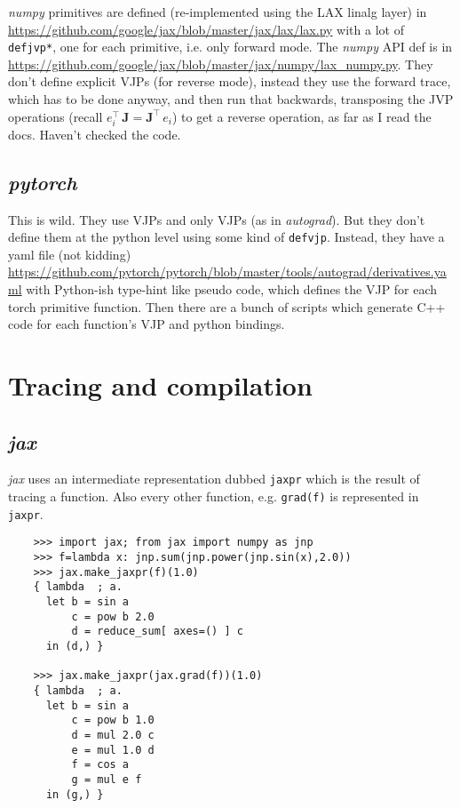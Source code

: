 \documentclass[paper=a4,11pt,headsepline]{scrartcl}
\newcommand{\ve}[1]{\ensuremath{\bm{\mathit{#1}}}}
\newcommand{\ma}[1]{\ensuremath{\bm{\mathbf{#1}}}}
\newcommand{\soft}[1]{\textsl{#1}\xspace}
\newcommand{\numpy}{\soft{numpy}}
\newcommand{\pytorch}{\soft{pytorch}}
\newcommand{\jax}{\soft{jax}}
\newcommand{\autograd}{\soft{autograd}}
\newcommand{\co}[1]{\texttt{#1}}
\begin{document}
\numpy primitives are defined (re-implemented using the LAX linalg layer) in
\url{https://github.com/google/jax/blob/master/jax/lax/lax.py} with a lot of
\co{defjvp*}, one for each primitive, i.e. only forward mode. The \numpy API
def is in
\url{https://github.com/google/jax/blob/master/jax/numpy/lax_numpy.py}. They
don't define explicit VJPs (for reverse mode), instead they use the forward
trace, which has to be done anyway, and then run that backwards, transposing
the JVP operations (recall $\ve e_i^\top\,\ma J = \ma J^\top\,\ve e_i$) to get
a reverse operation, as far as I read the docs. Haven't checked the code.

\subsection{\pytorch}

This is wild. They use VJPs and only VJPs (as in \autograd). But they don't
define them at the python level using some kind of \co{defvjp}. Instead, they
have a yaml file (not kidding)
\url{https://github.com/pytorch/pytorch/blob/master/tools/autograd/derivatives.yaml}
with Python-ish type-hint like pseudo code, which defines the VJP for each
torch primitive function. Then there are a bunch of scripts which generate C++
code for each function's VJP and python bindings.


\section{Tracing and compilation}

\subsection{\jax}

\jax uses an intermediate representation
dubbed \co{jaxpr} which is the result of tracing a function. Also every
other function, e.g. \co{grad(f)} is represented in \co{jaxpr}.

\begin{verbatim}
    >>> import jax; from jax import numpy as jnp
    >>> f=lambda x: jnp.sum(jnp.power(jnp.sin(x),2.0))
    >>> jax.make_jaxpr(f)(1.0)
    { lambda  ; a.
      let b = sin a
          c = pow b 2.0
          d = reduce_sum[ axes=() ] c
      in (d,) }

    >>> jax.make_jaxpr(jax.grad(f))(1.0)
    { lambda  ; a.
      let b = sin a
          c = pow b 1.0
          d = mul 2.0 c
          e = mul 1.0 d
          f = cos a
          g = mul e f
      in (g,) }
\end{verbatim}
\end{document}
